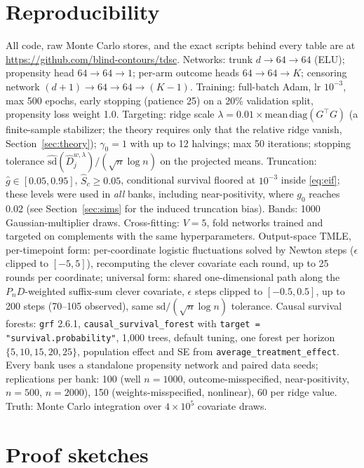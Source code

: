 \documentclass[11pt]{article}
\theoremstyle{remark}
\newcommand{\Pn}{P_n}
\begin{document}
\clearpage
\appendix
\section{Reproducibility}\label{app:repro}
All code, raw Monte Carlo stores, and the exact scripts behind every table are at \url{https://github.com/blind-contours/tdsc}. Networks: trunk $d\to64\to64$ (ELU); propensity head $64\to64\to1$; per-arm outcome heads $64\to64\to K$; censoring network $(d{+}1)\to64\to64\to(K{-}1)$. Training: full-batch Adam, lr $10^{-3}$, max 500 epochs, early stopping (patience 25) on a 20\% validation split, propensity loss weight 1.0. Targeting: ridge scale $\lambda = 0.01\times\mathrm{mean\,diag}(G^\top G)$ (a finite-sample stabilizer; the theory requires only that the relative ridge vanish, Section~\ref{sec:theory}); $\gamma_0=1$ with up to 12 halvings; max 50 iterations; stopping tolerance $\widehat{\mathrm{sd}}(\widehat D^{w,\lambda}_j)/(\sqrt n \log n)$ on the projected means. Truncation: $\hat g\in[0.05,0.95]$, $\hat S_c \ge 0.05$, conditional survival floored at $10^{-3}$ inside \eqref{eq:eif}; these levels were used in \emph{all} banks, including near-positivity, where $g_0$ reaches 0.02 (see Section~\ref{sec:sims} for the induced truncation bias). Bands: 1000 Gaussian-multiplier draws. Cross-fitting: $V=5$, fold networks trained and targeted on complements with the same hyperparameters. Output-space TMLE, per-timepoint form: per-coordinate logistic fluctuations solved by Newton steps ($\epsilon$ clipped to $[-5,5]$), recomputing the clever covariate each round, up to 25 rounds per coordinate; universal form: shared one-dimensional path along the $\Pn D$-weighted suffix-sum clever covariate, $\epsilon$ steps clipped to $[-0.5, 0.5]$, up to 200 steps (70--105 observed), same $\mathrm{sd}/(\sqrt n\log n)$ tolerance. Causal survival forests: \texttt{grf} 2.6.1, \texttt{causal\_survival\_forest} with \texttt{target = "survival.probability"}, 1{,}000 trees, default tuning, one forest per horizon $\{5,10,15,20,25\}$, population effect and SE from \texttt{average\_treatment\_effect}. Every bank uses a standalone propensity network and paired data seeds; replications per bank: 100 (well $n{=}1000$, outcome-misspecified, near-positivity, $n{=}500$, $n{=}2000$), 150 (weights-misspecified, nonlinear), 60 per ridge value. Truth: Monte Carlo integration over $4\times10^5$ covariate draws.

\section{Proof sketches}\label{app:proofs}
\end{document}
